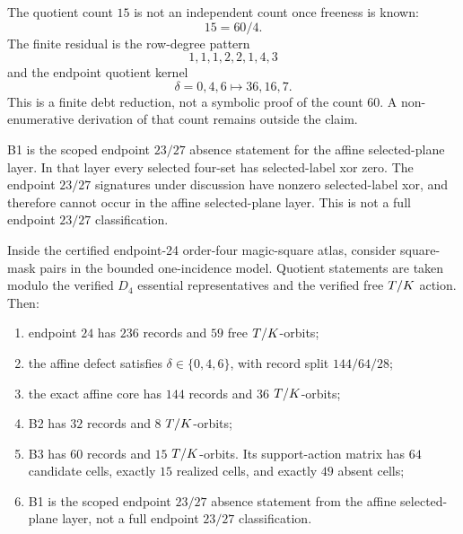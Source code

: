 \begin{certprop}
\label{cert:b3-count-collapse}
The quotient count \(15\) is not an independent count once freeness is known:
\[
  15=60/4.
\]
The finite residual is the row-degree pattern
\[
  1,1,1,2,2,1,4,3
\]
and the endpoint quotient kernel
\[
  \delta=0,4,6\mapsto36,16,7.
\]
This is a finite debt reduction, not a symbolic proof of the count \(60\).  A
non-enumerative derivation of that count remains outside the claim.
\end{certprop}

\begin{certprop}
\label{cert:b1-absence}
B1 is the scoped endpoint \(23/27\) absence statement for the affine
selected-plane layer.  In that layer every selected four-set has selected-label
xor zero.  The endpoint \(23/27\) signatures under discussion have nonzero
selected-label xor, and therefore cannot occur in the affine selected-plane
layer.  This is not a full endpoint \(23/27\) classification.
\end{certprop}

\begin{theorem}
\label{thm:b123-affine-defect-boundary}
Inside the certified endpoint-24 order-four magic-square atlas, consider square-mask pairs in
the bounded one-incidence model.  Quotient statements are taken modulo the
verified \(D_4\) essential representatives and the verified free \(T/K\)
action.  Then:
\begin{enumerate}[leftmargin=*]
\item endpoint \(24\) has \(236\) records and \(59\) free \(T/K\)-orbits;
\item the affine defect satisfies \(\delta\in\{0,4,6\}\), with record split
  \(144/64/28\);
\item the exact affine core has \(144\) records and \(36\) \(T/K\)-orbits;
\item B2 has \(32\) records and \(8\) \(T/K\)-orbits;
\item B3 has \(60\) records and \(15\) \(T/K\)-orbits.  Its support-action
  matrix has \(64\) candidate cells, exactly \(15\) realized cells, and
  exactly \(49\) absent cells;
\item B1 is the scoped endpoint \(23/27\) absence statement from the affine
  selected-plane layer, not a full endpoint \(23/27\) classification.
\end{enumerate}
\end{theorem}

